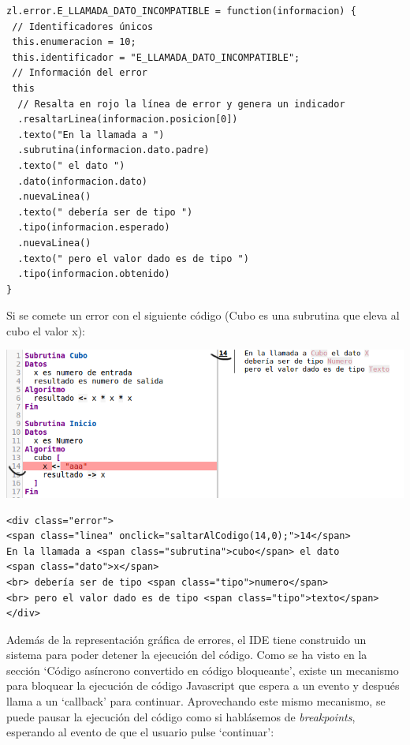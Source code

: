\documentclass{report}
\begin{document}
	\begin{BVerbatim}
zl.error.E_LLAMADA_DATO_INCOMPATIBLE = function(informacion) {
 // Identificadores únicos
 this.enumeracion = 10; 
 this.identificador = "E_LLAMADA_DATO_INCOMPATIBLE"; 
 // Información del error
 this
  // Resalta en rojo la línea de error y genera un indicador
  .resaltarLinea(informacion.posicion[0]) 
  .texto("En la llamada a ")
  .subrutina(informacion.dato.padre)
  .texto(" el dato ")
  .dato(informacion.dato)
  .nuevaLinea()
  .texto(" debería ser de tipo ")
  .tipo(informacion.esperado)
  .nuevaLinea()
  .texto(" pero el valor dado es de tipo ")
  .tipo(informacion.obtenido)
}
	\end{BVerbatim}
	
	Si se comete un error con el siguiente código (Cubo es una subrutina que eleva al cubo el valor x):
	
	\begin{center}
		\includegraphics[width=1\linewidth]{error}
	\end{center}
	
	\begin{BVerbatim}
<div class="error">
<span class="linea" onclick="saltarAlCodigo(14,0);">14</span>
En la llamada a <span class="subrutina">cubo</span> el dato 
<span class="dato">x</span>
<br> debería ser de tipo <span class="tipo">numero</span>
<br> pero el valor dado es de tipo <span class="tipo">texto</span>
</div>
	\end{BVerbatim}
	
	\vspace{10px}
	
	Además de la representación gráfica de errores, el IDE tiene construido un sistema para poder detener la ejecución del código. Como se ha visto en la sección  `Código asíncrono convertido en código bloqueante', existe un mecanismo para bloquear la ejecución de código Javascript que espera a un evento y después llama a un `callback' para continuar. Aprovechando este mismo mecanismo, se puede pausar la ejecución del código como si hablásemos de \textit{breakpoints}\cite{breakpoint}, esperando al evento de que el usuario pulse `continuar':
	
\end{document}
